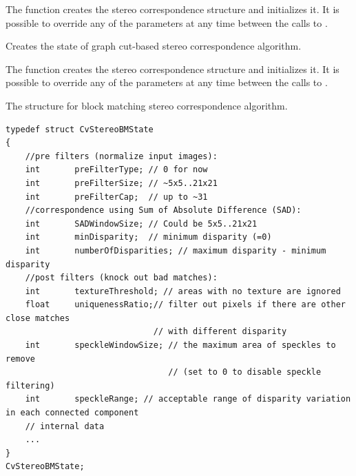 \begin{description}
\end{description}

The function creates the stereo correspondence structure and initializes it. It is possible to override any of the parameters at any time between the calls to .

Creates the state of graph cut-based stereo correspondence algorithm.


\begin{description}
\end{description}

The function creates the stereo correspondence structure and initializes it. It is possible to override any of the parameters at any time between the calls to .

The structure for block matching stereo correspondence algorithm.

\begin{lstlisting}
typedef struct CvStereoBMState
{
    //pre filters (normalize input images):
    int       preFilterType; // 0 for now
    int       preFilterSize; // ~5x5..21x21
    int       preFilterCap;  // up to ~31
    //correspondence using Sum of Absolute Difference (SAD):
    int       SADWindowSize; // Could be 5x5..21x21
    int       minDisparity;  // minimum disparity (=0)
    int       numberOfDisparities; // maximum disparity - minimum disparity
    //post filters (knock out bad matches):
    int       textureThreshold; // areas with no texture are ignored
    float     uniquenessRatio;// filter out pixels if there are other close matches
                              // with different disparity
    int       speckleWindowSize; // the maximum area of speckles to remove
                                 // (set to 0 to disable speckle filtering)
    int       speckleRange; // acceptable range of disparity variation in each connected component
    // internal data
    ...
}
CvStereoBMState;
\end{lstlisting}

